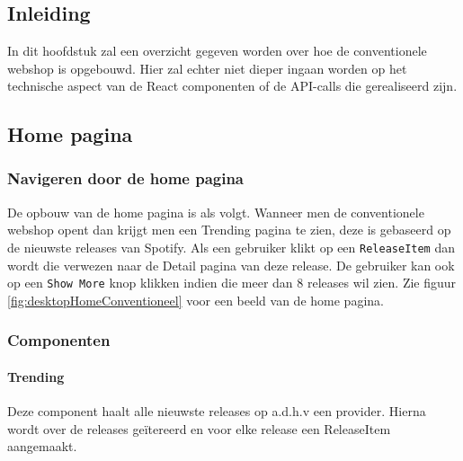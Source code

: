 
\chapter{}%
\label{ch:proofofconceptConventioneel}

\section{Inleiding}

In dit hoofdstuk zal een overzicht gegeven worden over hoe de conventionele webshop is opgebouwd. Hier zal echter niet dieper ingaan worden op het technische aspect van de React componenten of de API-calls die gerealiseerd zijn.

\section{Home pagina}

\subsection{Navigeren door de home pagina}
De opbouw van de home pagina is als volgt. Wanneer men de conventionele webshop opent dan krijgt men een Trending pagina te zien, deze is gebaseerd op de nieuwste releases van Spotify. Als een gebruiker klikt op een \texttt{ReleaseItem} dan wordt die verwezen naar de Detail pagina van deze release. De gebruiker kan ook op een \texttt{Show More} knop klikken indien die meer dan 8 releases wil zien. Zie figuur \ref{fig:desktopHomeConventioneel} voor een beeld van de home pagina.

\subsection{Componenten}

\subsubsection{Trending}

Deze component haalt alle nieuwste releases op a.d.h.v een provider. Hierna wordt over de releases geïtereerd en voor elke release een ReleaseItem aangemaakt.


